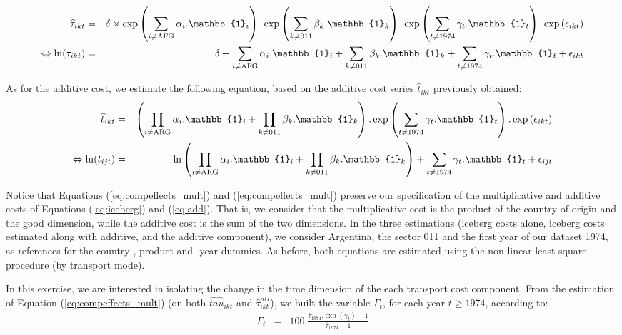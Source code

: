 \documentclass[a4paper,11pt]{article}
\begin{document}
\begin{eqnarray}
\widehat{\tau}_{ikt}&=&\delta\times \exp\left(\sum_{i \neq \text{AFG}}\alpha_i.\mathbb{1}_i\right).\exp\left(\sum_{k\neq \text{011}}\beta_k.\mathbb{1}_k\right).\exp\left(\sum_{t \neq 1974}\gamma_t.\mathbb{1}_t\right) .\exp\left(\epsilon_{ikt}\right) \notag \\
\Leftrightarrow \ln(\tau_{ikt})&=&\delta +\sum_{i \neq \text{AFG}}\alpha_i.\mathbb{1}_i + \sum_{k\neq \text{011}}\beta_k.\mathbb{1}_k + \sum_{t \neq 1974}\gamma_t.\mathbb{1}_t+\epsilon_{ikt} \label{eq:compeffects_mult}
\end{eqnarray}

As for the additive cost, we estimate the following equation, based on the additive cost series $\widehat{t}_{ikt}$ previously obtained:
\begin{eqnarray}
\widehat{t}_{ikt}&=&\left( \prod_{i \neq \text{ARG}}  \alpha_i.\mathbb{1}_i+\prod_{k\neq \text{011}}\beta_k.\mathbb{1}_k\right).\exp\left(\sum_{t \neq 1974}\gamma_t.\mathbb{1}_t\right) .\exp\left(\epsilon_{ikt}\right) \notag \\
\Leftrightarrow \ln(t_{ijt})&=&\ln\left( \prod_{i \neq \text{ARG}}  \alpha_i.\mathbb{1}_i+\prod_{k\neq \text{011}}\beta_k.\mathbb{1}_k\right) + \sum_{t \neq 1974}\gamma_t.\mathbb{1}_t+\epsilon_{ijt} \label{eq:compeffects_add}
\end{eqnarray}

Notice that Equations (\ref{eq:compeffects_mult}) and (\ref{eq:compeffects_mult}) preserve our specification of the multiplicative and additive costs of Equations (\ref{eq:iceberg}) and (\ref{eq:add}). That is, we consider that the multiplicative cost is the product of the country of origin and the good dimension, while the additive cost is the sum of the two dimensions. In the three estimations (iceberg costs alone, iceberg costs estimated along with additive, and the additive component), we consider Argentina, the sector 011 and the first year of our dataset 1974, as references for the country-, product and -year dummies. As before, both equations are estimated using the non-linear least square procedure (by transport mode). 

In this exercise, we are interested in isolating the change in the time dimension of the each transport cost component. From the estimation of Equation (\ref{eq:compeffects_mult}) (on both $\widehat{tau}_{ikt}$ and $\widehat{\tau}_{ikt}^{nlI}$), we built the variable $\Gamma_t$, for each year $t\geq 1974$, according to:
\begin{eqnarray}
\Gamma_t &=& 100.\frac {\bar{\tau}_{1974}.\exp(\gamma_t)-1} {\bar{\tau}_{1974}-1}
\end{eqnarray}
\end{document}
